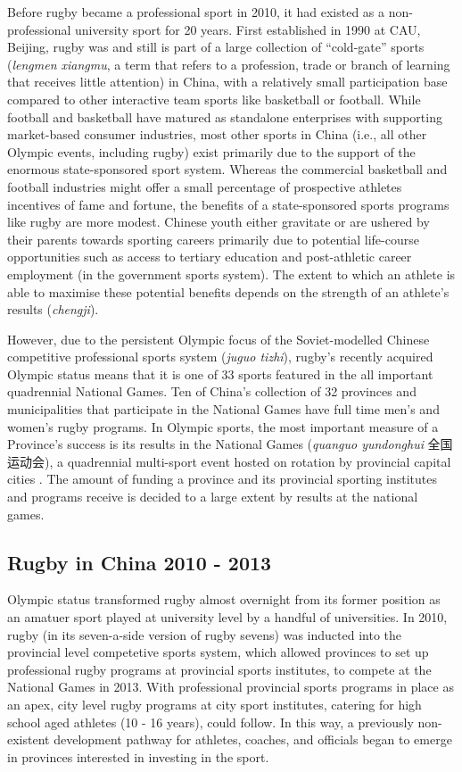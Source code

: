 {Before rugby became a professional sport in 2010, it had existed as a non-professional university sport for 20 years.  First established in 1990 at CAU, Beijing, rugby was and still is part of a large collection of ``cold-gate'' sports (\textit{lengmen xiangmu}, a term that refers to a profession, trade or branch of learning that receives little attention) in China, with a relatively small participation base compared to other interactive team sports like basketball or football.  While football and basketball have matured as standalone enterprises with supporting market-based consumer industries, most other sports in China (i.e., all other Olympic events, including rugby) exist primarily due to the support of the enormous state-sponsored sport system.  Whereas the commercial basketball and football industries might offer a small percentage of prospective athletes incentives of fame and fortune, the benefits of a state-sponsored sports programs like rugby are more modest.  Chinese youth either gravitate or are ushered by their parents towards sporting careers primarily due to potential life-course opportunities such as access to tertiary education and post-athletic career employment (in the government sports system).  The extent to which an athlete is able to maximise these potential benefits depends on the strength of an athlete's results (\textit{chengji}).

However, due to the persistent Olympic focus of the Soviet-modelled Chinese competitive professional sports system (\textit{juguo tizhi}), rugby's recently acquired Olympic status means that it is one of 33 sports featured in the all important quadrennial National Games.  Ten of China's collection of 32 provinces and municipalities that participate in the National Games have full time men's and women's rugby programs.  In Olympic sports, the most important measure of a Province's success is its results in the National Games (\textit{quanguo yundonghui} 全国运动会), a quadrennial multi-sport event hosted on rotation by provincial capital cities \citep{Hong2002}.  The amount of funding a province and its provincial sporting institutes and programs receive is decided to a large extent by results at the national games.


\subsection{Rugby in China 2010 - 2013}
Olympic status transformed rugby almost overnight from its former position as an amatuer sport played at university level by a handful of universities.  In 2010, rugby (in its seven-a-side version of rugby sevens) was inducted into the provincial level competetive sports system, which allowed provinces to set up professional rugby programs at provincial sports institutes, to compete at the National Games in 2013.  With professional provincial sports programs in place as an apex, city level rugby programs at city sport institutes, catering for high school aged athletes (10 - 16 years), could follow.  In this way, a previously non-existent development pathway for athletes, coaches, and officials began to emerge in provinces interested in investing in the sport.

}
